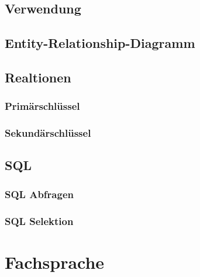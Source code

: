 \documentclass[12pt,a4paper]{article}
\begin{document}
\subsection{Verwendung}
\subsection{Entity-Relationship-Diagramm}
\subsection{Realtionen}
\subsubsection{Primärschlüssel}
\subsubsection{Sekundärschlüssel}
\subsection{SQL}
\subsubsection{SQL Abfragen}
\subsubsection{SQL Selektion}
\section{Fachsprache}
\end{document}
